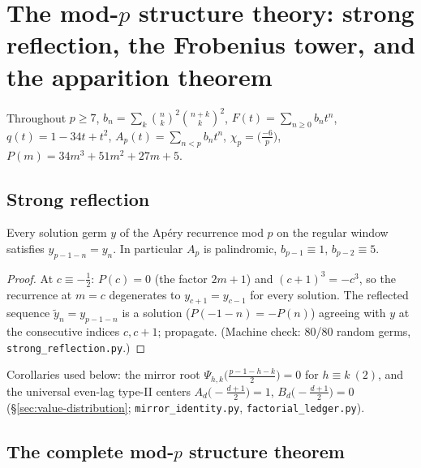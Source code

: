 
\section{The mod-$p$ structure theory: strong reflection, the Frobenius tower,
and the apparition theorem}
\label{sec:apparition-tower}

Throughout $p\ge7$, $b_n=\sum_k\binom nk^2\binom{n+k}k^2$,
$F(t)=\sum_{n\ge0}b_nt^n$, $q(t)=1-34t+t^2$,
$A_p(t)=\sum_{n<p}b_nt^n$, $\chi_p=\bigl(\tfrac{-6}p\bigr)$,
$P(m)=34m^3+51m^2+27m+5$.

\subsection{Strong reflection}

\begin{theorem}\label{thm:strong-reflection}
Every solution germ $y$ of the Ap\'ery recurrence mod $p$ on the regular
window satisfies $y_{p-1-n}=y_n$.  In particular $A_p$ is palindromic,
$b_{p-1}\equiv1$, $b_{p-2}\equiv5$.
\end{theorem}

\begin{proof}
At $c\equiv-\tfrac12$: $P(c)=0$ (the factor $2m+1$) and $(c+1)^3=-c^3$, so
the recurrence at $m=c$ degenerates to $y_{c+1}=y_{c-1}$ for every solution.
The reflected sequence $\tilde y_n=y_{p-1-n}$ is a solution
($P(-1-n)=-P(n)$) agreeing with $y$ at the consecutive indices $c,c+1$;
propagate.  (Machine check: 80/80 random germs, \texttt{strong\_reflection.py}.)
\end{proof}

Corollaries used below: the mirror root $\Psi_{h,k}\bigl(\tfrac{p-1-h-k}2\bigr)=0$
for $h\equiv k\ (2)$, and the universal even-lag type-II centers
$A_d\bigl(-\tfrac{d+1}2\bigr)=1$, $B_d\bigl(-\tfrac{d+1}2\bigr)=0$
(\S\ref{sec:value-distribution}; \texttt{mirror\_identity.py},
\texttt{factorial\_ledger.py}).

\subsection{The complete mod-$p$ structure theorem}

